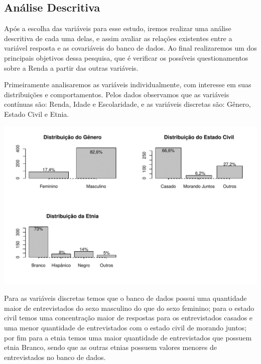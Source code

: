 \documentclass[]{article}
\begin{document}
\subsection{Análise Descritiva}\label{analise-descritiva}

Após a escolha das variáveis para esse estudo, iremos realizar uma
análise descritiva de cada uma delas, e assim avaliar as relações
existentes entre a variável resposta e as covariáveis do banco de dados.
Ao final realizaremos um dos principais objetivos dessa pesquisa, que é
verificar os possíveis questionamentos sobre a Renda a partir das outras
variáveis.

Primeiramente analisaremos as variáveis individualmente, com interesse
em suas distribuições e comportamentos. Pelos dados observamos que as
variáveis contínuas são: Renda, Idade e Escolaridade, e as variáveis
discretas são: Gênero, Estado Civil e Etnia.

\begin{flushleft}\includegraphics{Relatorio_IC_files/figure-latex/unnamed-chunk-6-1} \end{flushleft}

Para as variáveis discretas temos que o banco de dados possui uma
quantidade maior de entrevistados do sexo masculino do que do sexo
feminino; para o estado civil temos uma concentração maior de respostas
para os entrevistados casados e uma menor quantidade de entrevistados
com o estado civil de morando juntos; por fim para a etnia temos uma
maior quantidade de entrevistados que possuem etnia Branco, sendo que as
outras etnias possuem valores menores de entrevistados no banco de
dados.
\end{document}
